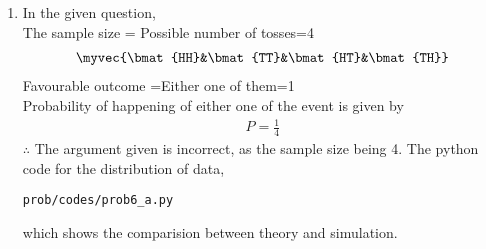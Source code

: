 \renewcommand{\theequation}{\theenumi}
\begin{enumerate}[label=\arabic*.,ref=\thesubsubsection.\theenumi]

\item In the given question,
\\
The sample size = Possible number of tosses=4
\begin{align}
\myvec{\bmat{HH}&\bmat{TT}&\bmat{HT}&\bmat{TH}}
\end{align}
Favourable outcome =Either one of them=1
\\
Probability of happening of either one of the event is given by
\begin{align}
P=\frac{1}{4}
\end{align}
$\therefore$ The argument given is incorrect, as the sample size being 4.
The python code for the distribution of data,
\begin{lstlisting}
prob/codes/prob6_a.py
\end{lstlisting}
which shows the comparision between theory and simulation.
\end{enumerate}
